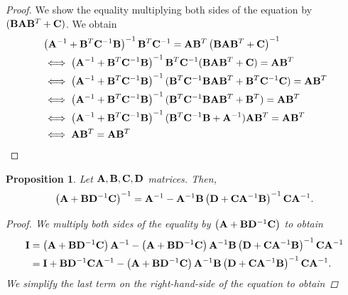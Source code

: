 \documentclass[12pt, oneside]{book}
\numberwithin{equation}{section}
\newtheorem{proposition}{Proposition}[section]
\begin{document}
{\begin{appendices}
\begin{proof}
	We show the equality multiplying both sides of the equation by $({\bf B} {\bf A} {\bf B}^T + {\bf C})$. We obtain
	\begin{align}
		&\left({\bf A}^{-1} + {\bf B}^T {\bf C}^{-1} {\bf B}\right)^{-1}{\bf B}^T {\bf C}^{-1} = {\bf A}{\bf B}^T\left({\bf B}{\bf A}{\bf B}^T + {\bf C}\right)^{-1}\\
		&\iff \left({\bf A}^{-1} + {\bf B}^T {\bf C}^{-1} {\bf B}\right)^{-1}{\bf B}^T {\bf C}^{-1}({\bf B} {\bf A} {\bf B}^T + {\bf C}) = {\bf A}{\bf B}^T\\
		&\iff \left({\bf A}^{-1} + {\bf B}^T {\bf C}^{-1} {\bf B}\right)^{-1}({\bf B}^T {\bf C}^{-1}{\bf B} {\bf A} {\bf B}^T + {\bf B}^T {\bf C}^{-1}{\bf C}) = {\bf A}{\bf B}^T\\
		&\iff \left({\bf A}^{-1} + {\bf B}^T {\bf C}^{-1} {\bf B}\right)^{-1}({\bf B}^T {\bf C}^{-1}{\bf B} {\bf A} {\bf B}^T + {\bf B}^T) = {\bf A}{\bf B}^T\\
		&\iff \left({\bf A}^{-1} + {\bf B}^T {\bf C}^{-1} {\bf B}\right)^{-1}({\bf B}^T {\bf C}^{-1}{\bf B} + {\bf A}^{-1}){\bf A} {\bf B}^T = {\bf A}{\bf B}^T\\
		&\iff {\bf A}{\bf B}^T = {\bf A}{\bf B}^T
	\end{align}
\end{proof}
\begin{proposition} \label{prop:woodbury-identity}
	Let ${\bf A}, {\bf B}, {\bf C}, {\bf D}$ matrices. Then,
	\begin{equation}
		\left({\bf A} + {\bf B} {\bf D}^{-1}{\bf C}\right)^{-1} = {\bf A}^{-1} - {\bf A}^{-1}{\bf B}\left({\bf D} + {\bf C}{\bf A}^{-1}{\bf B}\right)^{-1}{\bf C}{\bf A}^{-1}.
	\end{equation}
	\begin{proof}
		We multiply both sides of the equality by $\left({\bf A} + {\bf B} {\bf D}^{-1}{\bf C}\right)$ to obtain
		\begin{align}
			{\bf I} &=\left({\bf A} + {\bf B} {\bf D}^{-1}{\bf C}\right) {\bf A}^{-1} - \left({\bf A} + {\bf B} {\bf D}^{-1}{\bf C}\right) {\bf A}^{-1}{\bf B}\left({\bf D} + {\bf C}{\bf A}^{-1}{\bf B}\right)^{-1}{\bf C}{\bf A}^{-1}\\
			&= {\bf I} + {\bf B} {\bf D}^{-1}{\bf C}{\bf A}^{-1} - \left({\bf A} + {\bf B} {\bf D}^{-1}{\bf C}\right) {\bf A}^{-1}{\bf B}\left({\bf D} + {\bf C}{\bf A}^{-1}{\bf B}\right)^{-1}{\bf C}{\bf A}^{-1}.
		\end{align}
		We simplify the last term on the right-hand-side of the equation to obtain

\end{proof}
\end{proposition}
\end{appendices}}
\end{document}
